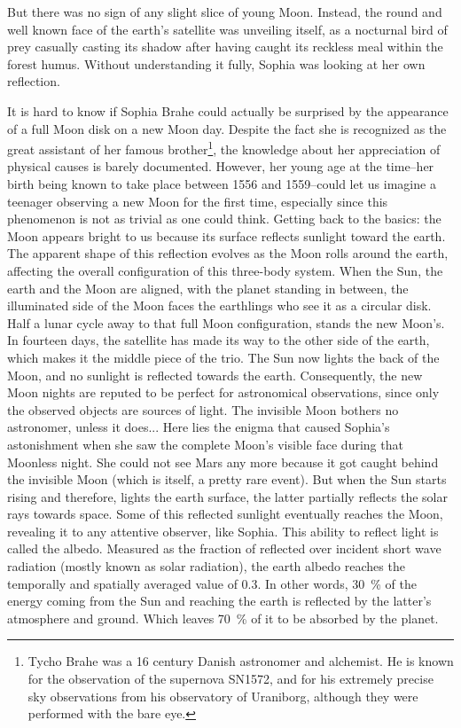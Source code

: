 But there was no sign of any slight slice of young Moon. Instead, the round and well known face of the earth's satellite was unveiling itself, as a nocturnal bird of prey casually casting its shadow after having caught its reckless meal within the forest humus.
Without understanding it fully, Sophia was looking at her own reflection. 
\vspace{\baselineskip}

It is hard to know if Sophia Brahe could actually be surprised by the appearance of a full Moon disk on a new Moon day. Despite the fact she is recognized as the great assistant of her famous brother\footnote{Tycho Brahe was a 16 century Danish astronomer and alchemist. He is known for the observation of the supernova SN1572, and for his extremely precise sky observations from his observatory of Uraniborg, although they were performed with the bare eye.}, the knowledge about her appreciation of physical causes is barely documented. However, her young age at the time\---her birth being known to take place between 1556 and 1559\---could let us imagine a teenager observing a new Moon for the first time, especially since this phenomenon is not as trivial as one could think.
Getting back to the basics: the Moon appears bright to us because its surface reflects sunlight toward the earth. The apparent shape of this reflection evolves as the Moon rolls around the earth, affecting the overall configuration of this three-body system.
When the Sun, the earth and the Moon are aligned, with the planet standing in between, the illuminated side of the Moon faces the earthlings who see it as a circular disk. Half a lunar cycle away to that full Moon configuration, stands the new Moon's. In fourteen days, the satellite has made its way to the other side of the earth, which makes it the middle piece of the trio. The Sun now lights the back of the Moon, and no sunlight is reflected towards the earth. 
Consequently, the new Moon nights are reputed to be perfect for astronomical observations, since only the observed objects are sources of light. The invisible Moon bothers no astronomer, unless it does...
Here lies the enigma that caused Sophia's astonishment when she saw the complete Moon's visible face during that Moonless night. She could not see Mars any more because it got caught behind the invisible Moon (which is itself, a pretty rare event). But when the Sun starts rising and therefore, lights the earth surface, the latter partially reflects the solar rays towards space. Some of this reflected sunlight eventually reaches the Moon, revealing it to any attentive observer, like Sophia.
This ability to reflect light is called the albedo. Measured as the fraction of reflected over incident short wave radiation (mostly known as solar radiation), the earth albedo reaches the temporally and spatially averaged value of \num{0.3}. In other words, \SI{30}{\%} of the energy coming from the Sun and reaching the earth is reflected by the latter's atmosphere and ground. Which leaves \SI{70}{\%} of it to be absorbed by the planet. 

